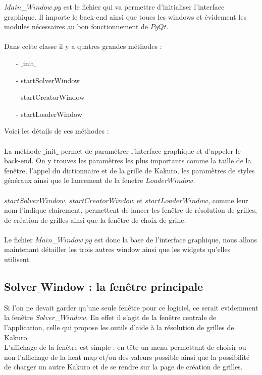 \documentclass[12pt]{article}
\begin{document}
$Main$\_$Window.py$ est le fichier qui va permettre d'initialiser l'interface graphique. Il importe le back-end ainsi que toues les windows et évidement les modules nécessaires au bon fonctionnement de $PyQt$. \\  \\
Dans cette classe il y a quatres grandes méthodes : \\
\begin{enumerate}
\item[-] $\_$init$\_$ 
\item[-] startSolverWindow  
\item[-] startCreatorWindow 
\item[-] startLoaderWindow \\
\end{enumerate}
Voici les détails de ces méthodes : \\ \\
La méthode $\_$init$\_$ permet de paramétrer l'interface graphique et d'appeler le back-end. On y trouves les paramètres les plus importants comme la taille de la fenêtre, l'appel du dictionnaire et de la grille de Kakuro, les paramètres de styles généraux ainsi que le lancement de la fenetre $LoaderWindow$. \\ \\

$startSolverWindow$, $startCreatorWindow$ et $startLoaderWindow$, comme leur nom l'indique clairement, permettent de lancer les fenêtre de résolution de grilles, de création de grilles ainsi que la fenêtre de choix de grille. \\ \\

Le fichier $Main$\_$Window.py$ est donc la base de l'interface graphique, nous allons maintenant détailler les trois autres window ainsi que les widgets qu'elles utilisent. 

\newpage


\subsection{Solver$\_$Window : la fenêtre principale}

Si l'on ne devait garder qu'une seule fenêtre pour ce logiciel, ce serait evidemment la fenêtre $Solver$\_$Window$. En effet il s'agit de la fenêtre centrale de l'application, celle qui propose les outils d'aide à la résolution de grilles de Kakuro. \\
L'affichage de la fenêtre est simple : en tête un menu permettant de choisir ou non l'affichage de la heat map et/ou des valeurs possible ainsi que la possibilité de charger un autre Kakuro et de se rendre sur la page de création de grilles. \\ \\
\end{document}
